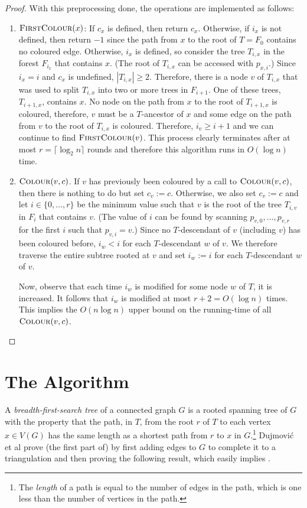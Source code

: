 \documentclass[kpfonts]{patmorin}
\let\ge\geqslant
\begin{document}
\begin{proof}
    With this preprocessing done, the operations are implemented as follows:
    \begin{enumerate}
    \item $\textsc{FirstColour}(x)$:  If $c_x$ is defined, then return $c_x$.   Otherwise, if $i_x$ is not defined, then return $-1$ since the path from $x$ to the root of $T=F_0$ contains no coloured edge.  Otherwise, $i_x$ is defined, so consider the tree $T_{i,x}$ in the forest $F_{i_x}$ that contains $x$.  (The root of $T_{i,x}$ can be accessed with $p_{x,i}$.)  Since $i_x=i$ and $c_x$ is undefined, $|T_{i,x}|\ge 2$.  Therefore, there is a node $v$ of $T_{i,x}$ that was used to split $T_{i,x}$ into two or more trees in $F_{i+1}$.  One of these trees, $T_{i+1,x}$, contains $x$.  No node on the path from $x$ to the root of $T_{i+1,x}$ is coloured, therefore, $v$ must be a $T$-ancestor of $x$ and some edge on the path from $v$ to the root of $T_{i,x}$ is coloured.  Therefore, $i_v\ge i+1$ and we can continue to find $\textsc{FirstColour}(v)$.  This process clearly terminates after at most $r=\lceil\log_2 n\rceil$ rounds and therefore this algorithm runs in $O(\log n)$ time.

    \item $\textsc{Colour}(v,c)$. If $v$ has previously been coloured by a call to $\textsc{Colour}(v,c)$, then there is nothing to do but set $c_v:=c$.  Otherwise, we also set $c_v:=c$ and let $i\in\{0,\ldots,r\}$ be the minimum value such that $v$ is the root of the tree $T_{i,v}$ in $F_i$ that contains $v$.  (The value of $i$ can be found by scanning $p_{v,0},\ldots,p_{v,r}$ for the first $i$ such that $p_{v,i}=v$.)   Since no $T$-descendant of $v$ (including $v$) has been coloured before, $i_w < i$ for each $T$-descendant $w$ of $v$.  We therefore traverse the entire subtree rooted at $v$ and set $i_w:=i$ for each $T$-descendant $w$ of $v$.

    Now, observe that each time $i_w$ is modified for some node $w$ of $T$, it is increased.  It follows that $i_w$ is modified at most $r+2=O(\log n)$ times.  This implies the $O(n\log n)$ upper bound on the running-time of all $\textsc{Colour}(v,c)$. \qedhere
  \end{enumerate}
\end{proof}


\section{The Algorithm}

A \emph{breadth-first-search tree} of a connected graph $G$ is a rooted spanning tree of $G$ with the property that the path, in $T$, from the root $r$ of $T$ to each vertex $x\in V(G)$ has the same length as a shortest path from $r$ to $x$ in $G$.\footnote{The \emph{length} of a path is equal to the number of edges in the path, which is one less than the number of vertices in the path.}  Dujmović et al \cite{dujmovic.joret.ea:planar} prove (the first part of)  by first adding edges to $G$ to complete it to a triangulation and then proving the following result, which easily implies .
\end{document}
